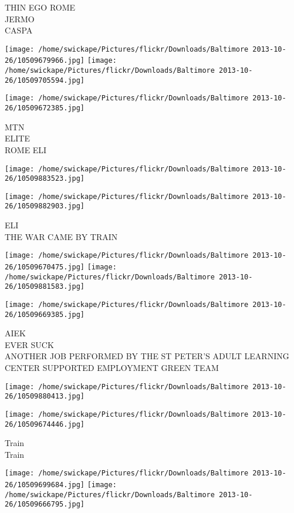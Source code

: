 \documentclass[10pt,letterpaper]{article}
\begin{document}
THIN EGO ROME\\
JERMO\\
CASPA\\
\pagebreak

\texttt{[image: /home/swickape/Pictures/flickr/Downloads/Baltimore 2013-10-26/10509679966.jpg]}
\texttt{[image: /home/swickape/Pictures/flickr/Downloads/Baltimore 2013-10-26/10509705594.jpg]}

\texttt{[image: /home/swickape/Pictures/flickr/Downloads/Baltimore 2013-10-26/10509672385.jpg]}

MTN\\
ELITE\\
ROME ELI\\
\pagebreak

\texttt{[image: /home/swickape/Pictures/flickr/Downloads/Baltimore 2013-10-26/10509883523.jpg]}

\vspace{0.25in}
\texttt{[image: /home/swickape/Pictures/flickr/Downloads/Baltimore 2013-10-26/10509882903.jpg]}

ELI\\
THE WAR CAME BY TRAIN\\
\pagebreak

\texttt{[image: /home/swickape/Pictures/flickr/Downloads/Baltimore 2013-10-26/10509670475.jpg]}
\texttt{[image: /home/swickape/Pictures/flickr/Downloads/Baltimore 2013-10-26/10509881583.jpg]}

\texttt{[image: /home/swickape/Pictures/flickr/Downloads/Baltimore 2013-10-26/10509669385.jpg]}

AIEK\\
EVER SUCK\\
ANOTHER JOB PERFORMED BY THE ST PETER'S ADULT LEARNING CENTER SUPPORTED EMPLOYMENT GREEN TEAM\\
\pagebreak

\texttt{[image: /home/swickape/Pictures/flickr/Downloads/Baltimore 2013-10-26/10509880413.jpg]}

\vspace{0.25in}
\texttt{[image: /home/swickape/Pictures/flickr/Downloads/Baltimore 2013-10-26/10509674446.jpg]}

Train\\
Train\\
\pagebreak

\texttt{[image: /home/swickape/Pictures/flickr/Downloads/Baltimore 2013-10-26/10509699684.jpg]}
\texttt{[image: /home/swickape/Pictures/flickr/Downloads/Baltimore 2013-10-26/10509666795.jpg]}
\end{document}
